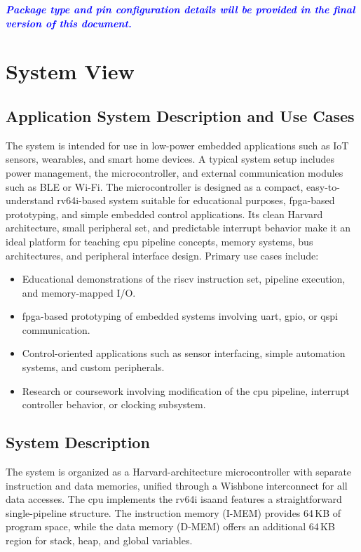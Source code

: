 \begin{itemize}
\textcolor{blue}{\textbf{\textit{Package type and pin configuration details will be provided in the final version of this document.}}}

\section{System View} 

\subsection{Application System Description and Use Cases}
The system is intended for use in low-power embedded applications such as IoT sensors, 
wearables, and smart home devices. A typical system setup includes power management, 
the microcontroller, and external communication modules such as BLE or Wi-Fi. The microcontroller is designed as a compact, easy-to-understand \gls{rv64i}-based system suitable for 
educational purposes, \gls{fpga}-based prototyping, and simple embedded control applications. Its clean 
\gls{Harvard} architecture, small peripheral set, and predictable interrupt behavior make it an ideal 
platform for teaching \gls{cpu} \gls{pipeline} concepts, memory systems, bus architectures, and peripheral 
interface design.
Primary use cases include:
\begin{itemize}
  \item Educational demonstrations of the \gls{riscv} instruction set, \gls{pipeline} execution, and memory-mapped I/O.
  \item \gls{fpga}-based prototyping of embedded systems involving \gls{uart}, \gls{gpio}, or \gls{qspi} communication.
  \item Control-oriented applications such as sensor interfacing, simple automation systems, and custom peripherals.
  \item Research or coursework involving modification of the \gls{cpu} \gls{pipeline}, interrupt controller behavior, or clocking subsystem.
\end{itemize}

\subsection{System Description}
The system is organized as a \gls{Harvard}-architecture microcontroller with separate instruction and data memories, unified through a Wishbone interconnect for all data accesses. The \gls{cpu} implements the \gls{rv64i} \gls{isa}and features a straightforward single-\gls{pipeline} structure. The instruction memory (\gls{I-MEM}) provides 64\,KB of program space, while the data memory (\gls{D-MEM}) offers an additional 64\,KB region for stack, heap, and global variables.


\end{itemize}
